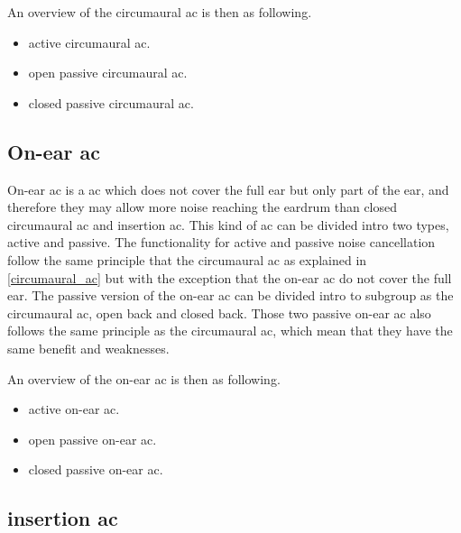 An overview of the circumaural \gls{ac} is then as following.

\begin{itemize}
\item active circumaural \gls{ac}.
\item open passive circumaural \gls{ac}.
\item closed passive circumaural \gls{ac}.
\end{itemize}

\subsection{On-ear \gls{ac}} 
On-ear \gls{ac} is a \gls{ac} which does not cover the full ear but only part of the ear, and therefore they may allow more noise reaching the eardrum than closed circumaural \gls{ac} and insertion \gls{ac}. This kind of \gls{ac} can be divided intro two types, active and passive. The functionality for active and passive noise cancellation follow the same principle that the circumaural \gls{ac} as explained in \autoref{circumaural_ac} but with the exception that the on-ear \gls{ac} do not cover the full ear. The passive version of the on-ear \gls{ac} can be divided intro to subgroup as the circumaural \gls{ac}, open back and closed back. Those two passive on-ear \gls{ac} also follows the same principle as the circumaural \gls{ac}, which mean that they have the same benefit and weaknesses.

An overview of the on-ear \gls{ac} is then as following.

\begin{itemize}
\item active on-ear \gls{ac}.
\item open passive on-ear \gls{ac}.
\item closed passive on-ear \gls{ac}.
\end{itemize}

\subsection{insertion \gls{ac}} 
